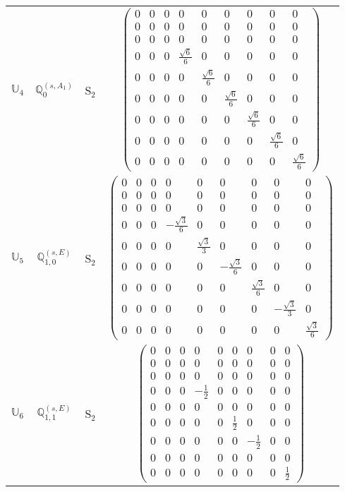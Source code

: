 \documentclass[fleqn,10pt,landscape]{article}
\begin{document}
\begin{itemize}
\begin{center}
\begin{longtable}{c|c|c|c}
$ \mathbb{U}_{4} $ & $\mathbb{Q}_{0}^{(s,A_{1})}$ & S$_{2}$ & $\begin{pmatrix} 0 & 0 & 0 & 0 & 0 & 0 & 0 & 0 & 0 \\ 0 & 0 & 0 & 0 & 0 & 0 & 0 & 0 & 0 \\ 0 & 0 & 0 & 0 & 0 & 0 & 0 & 0 & 0 \\ 0 & 0 & 0 & \frac{\sqrt{6}}{6} & 0 & 0 & 0 & 0 & 0 \\ 0 & 0 & 0 & 0 & \frac{\sqrt{6}}{6} & 0 & 0 & 0 & 0 \\ 0 & 0 & 0 & 0 & 0 & \frac{\sqrt{6}}{6} & 0 & 0 & 0 \\ 0 & 0 & 0 & 0 & 0 & 0 & \frac{\sqrt{6}}{6} & 0 & 0 \\ 0 & 0 & 0 & 0 & 0 & 0 & 0 & \frac{\sqrt{6}}{6} & 0 \\ 0 & 0 & 0 & 0 & 0 & 0 & 0 & 0 & \frac{\sqrt{6}}{6} \end{pmatrix}$ \\
$ \mathbb{U}_{5} $ & $\mathbb{Q}_{1,0}^{(s,E)}$ & S$_{2}$ & $\begin{pmatrix} 0 & 0 & 0 & 0 & 0 & 0 & 0 & 0 & 0 \\ 0 & 0 & 0 & 0 & 0 & 0 & 0 & 0 & 0 \\ 0 & 0 & 0 & 0 & 0 & 0 & 0 & 0 & 0 \\ 0 & 0 & 0 & - \frac{\sqrt{3}}{6} & 0 & 0 & 0 & 0 & 0 \\ 0 & 0 & 0 & 0 & \frac{\sqrt{3}}{3} & 0 & 0 & 0 & 0 \\ 0 & 0 & 0 & 0 & 0 & - \frac{\sqrt{3}}{6} & 0 & 0 & 0 \\ 0 & 0 & 0 & 0 & 0 & 0 & \frac{\sqrt{3}}{6} & 0 & 0 \\ 0 & 0 & 0 & 0 & 0 & 0 & 0 & - \frac{\sqrt{3}}{3} & 0 \\ 0 & 0 & 0 & 0 & 0 & 0 & 0 & 0 & \frac{\sqrt{3}}{6} \end{pmatrix}$ \\
$ \mathbb{U}_{6} $ & $\mathbb{Q}_{1,1}^{(s,E)}$ & S$_{2}$ & $\begin{pmatrix} 0 & 0 & 0 & 0 & 0 & 0 & 0 & 0 & 0 \\ 0 & 0 & 0 & 0 & 0 & 0 & 0 & 0 & 0 \\ 0 & 0 & 0 & 0 & 0 & 0 & 0 & 0 & 0 \\ 0 & 0 & 0 & - \frac{1}{2} & 0 & 0 & 0 & 0 & 0 \\ 0 & 0 & 0 & 0 & 0 & 0 & 0 & 0 & 0 \\ 0 & 0 & 0 & 0 & 0 & \frac{1}{2} & 0 & 0 & 0 \\ 0 & 0 & 0 & 0 & 0 & 0 & - \frac{1}{2} & 0 & 0 \\ 0 & 0 & 0 & 0 & 0 & 0 & 0 & 0 & 0 \\ 0 & 0 & 0 & 0 & 0 & 0 & 0 & 0 & \frac{1}{2} \end{pmatrix}$ \\

\end{longtable}
\end{center}
\end{itemize}
\end{document}
